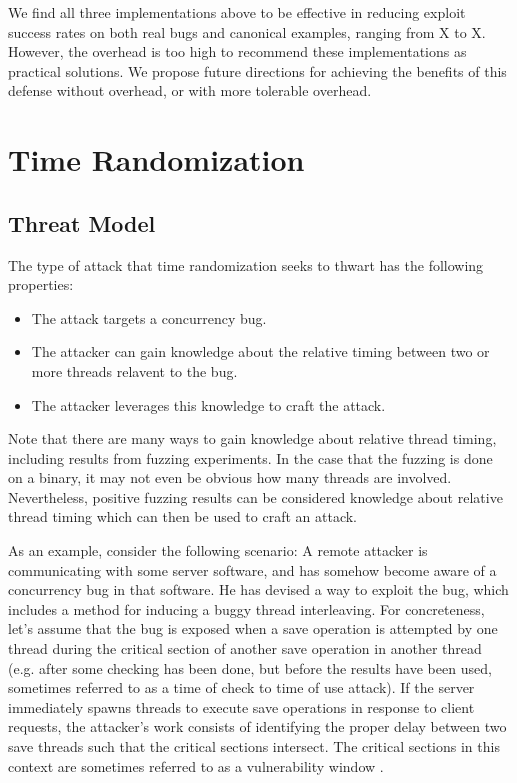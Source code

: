 \documentclass[letterpaper,twocolumn,10pt]{article}
\begin{document}
We find all three implementations above to be effective in reducing exploit success rates on both real bugs and canonical examples, ranging from X to X.  However, the overhead is too high to recommend these implementations as practical solutions.  We propose future directions for achieving the benefits of this defense without overhead, or with more tolerable overhead.

\section{Time Randomization}
\subsection{Threat Model}
The type of attack that time randomization seeks to thwart has the following properties:
\begin{itemize}
	\item The attack targets a concurrency bug.
	\item The attacker can gain knowledge about the relative timing between two or more threads relavent to the bug.
	\item The attacker leverages this knowledge to craft the attack.
\end{itemize}
Note that there are many ways to gain knowledge about relative thread timing, including results from fuzzing experiments.
In the case that the fuzzing is done on a binary, it may not even be obvious how many threads are involved.
Nevertheless, positive fuzzing results can be considered knowledge about relative thread timing which can then be used to craft an attack.

As an example, consider the following scenario:
A remote attacker is communicating with some server software, and has somehow become aware of a concurrency bug in that software.
He has devised a way to exploit the bug, which includes a method for inducing a buggy thread interleaving.
For concreteness, let's assume that the bug is exposed when a save operation is attempted by one thread during the critical section of another save operation in another thread (e.g. after some checking has been done, but before the results have been used, sometimes referred to as a time of check to time of use attack).
If the server immediately spawns threads to execute save operations in response to client requests, the attacker's work consists of identifying the proper delay between two save threads such that the critical sections intersect.
The critical sections in this context are sometimes referred to as a vulnerability window \cite{Yang2012}.
\end{document}
